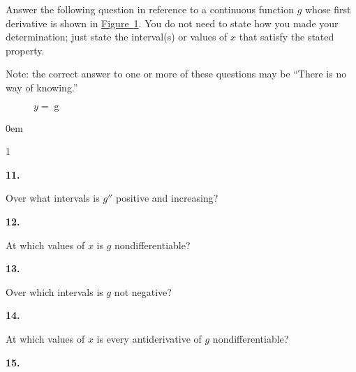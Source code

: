 \documentclass[12pt,]{book}
\theoremstyle{plain}
\theoremstyle{definition}
\numberwithin{equation}{section}
\newenvironment{exercisegroup}%
{\medskip\noindent}%
{\par\bigskip}%
\newlength{\exercisegroupindent}%
\newlength{\exercisegroupitemwidth}%
\newenvironment{exercisegrouplist}%
{\vspace{-\partopsep}%
\begin{adjustwidth}{\exercisegroupindent}{0em}}%
{\end{adjustwidth}%
\vspace{-\partopsep}%
\vspace{\baselineskip}}%
\newenvironment{exercisegroupbycol}[1]%
{\begin{exercisegrouplist}%
\vspace{-\multicolsep}%
\begin{multicols}{#1}%
\setlength{\parindent}{0em}%
\setlength{\exercisegroupitemwidth}{\linewidth}}%
{\end{multicols}%
\vspace{-\multicolsep}%
\end{exercisegrouplist}}%
\newenvironment{exercisegroupitem}[1]%
{\begin{minipage}[t]{\exercisegroupitemwidth}
\vspace{0pt}%
{\bfseries#1}%
\rule{0pt}{\baselineskip}}{\strut%
\end{minipage}%
\hspace{\columnsep}}%
\providecommand\phantomsection{}
\newcommand{\fe}[2]{\mathop{{#1}{\left(#2\right)}}}
\newcommand{\sd}[1]{#1''}
\begin{document}
\begin{exercisegroup}%
Answer the following question in reference to a continuous function \(g\) whose first derivative is shown in \hyperref[figure-discontinuous-derivative]{Figure~\ref*{figure-discontinuous-derivative}}.  You do not need to state how you made your determination; just state the interval(s) or values of \(x\) that satisfy the stated property.%
\par
Note: the correct answer to one or more of these questions may be ``There is no way of knowing.''%
\begin{figure}
\centering
{
}
\caption{\(y=\fe{g}{x}\)\label{figure-discontinuous-derivative}}
\end{figure}
\par
\begin{exercisegroupbycol}{1}%
\begin{exercisegroupitem}{11. }\phantomsection\hypertarget{exercise-251}{\null}
Over what intervals is \(\sd{g}\) positive and increasing?%
\end{exercisegroupitem}%
\par%
\begin{exercisegroupitem}{12. }\phantomsection\hypertarget{exercise-252}{\null}
At which values of \(x\) is \(g\) nondifferentiable?%
\end{exercisegroupitem}%
\par%
\begin{exercisegroupitem}{13. }\phantomsection\hypertarget{exercise-253}{\null}
Over which intervals is \(g\) not negative?%
\end{exercisegroupitem}%
\par%
\begin{exercisegroupitem}{14. }\phantomsection\hypertarget{exercise-254}{\null}
At which values of \(x\) is every antiderivative of \(g\) nondifferentiable?%
\end{exercisegroupitem}%
\par%
\begin{exercisegroupitem}{15. }\phantomsection\hypertarget{exercise-255}{\null}

\end{exercisegroupitem}
\end{exercisegroupbycol}
\end{exercisegroup}
\end{document}
